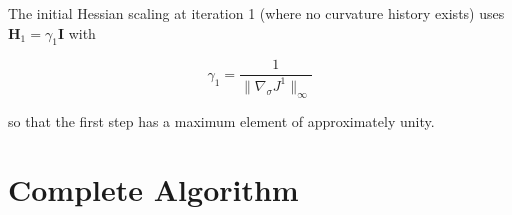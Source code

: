 \documentclass[12pt]{article}
\begin{document}
The initial Hessian scaling at iteration 1 (where no curvature history exists)
uses $\mathbf{H}_1 = \gamma_1 \mathbf{I}$ with

\begin{equation}
  \gamma_1 = \frac{1}{\|\nabla_\sigma J^1\|_\infty}
\end{equation}

so that the first step has a maximum element of approximately unity.

\section{Complete Algorithm}
\end{document}
